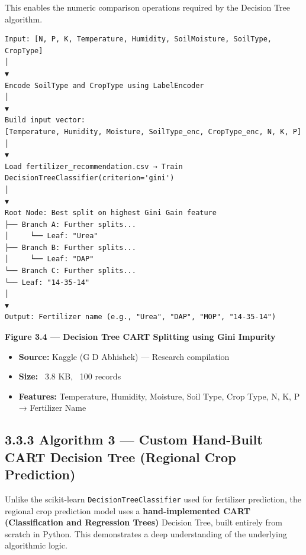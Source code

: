 \documentclass[12pt,a4paper]{report}
\begin{document}
This enables the numeric comparison operations required by the Decision Tree algorithm.


\begin{verbatim}
Input: [N, P, K, Temperature, Humidity, SoilMoisture, SoilType, CropType]
│
▼
Encode SoilType and CropType using LabelEncoder
│
▼
Build input vector:
[Temperature, Humidity, Moisture, SoilType_enc, CropType_enc, N, K, P]
│
▼
Load fertilizer_recommendation.csv → Train DecisionTreeClassifier(criterion='gini')
│
▼
Root Node: Best split on highest Gini Gain feature
├── Branch A: Further splits...
│     └── Leaf: "Urea"
├── Branch B: Further splits...
│     └── Leaf: "DAP"
└── Branch C: Further splits...
└── Leaf: "14-35-14"
│
▼
Output: Fertilizer name (e.g., "Urea", "DAP", "MOP", "14-35-14")
\end{verbatim}

\textbf{Figure 3.4 — Decision Tree CART Splitting using Gini Impurity}


\begin{itemize}
\item \textbf{Source:} Kaggle (G D Abhishek) — Research compilation
\item \textbf{Size:} ~3.8 KB, ~100 records
\item \textbf{Features:} Temperature, Humidity, Moisture, Soil Type, Crop Type, N, K, P → Fertilizer Name
\end{itemize}
\newpage

\subsection{3.3.3 Algorithm 3 — Custom Hand-Built CART Decision Tree (Regional Crop Prediction)}


Unlike the scikit-learn \texttt{DecisionTreeClassifier} used for fertilizer prediction, the regional crop prediction model uses a \textbf{hand-implemented CART (Classification and Regression Trees)} Decision Tree, built entirely from scratch in Python. This demonstrates a deep understanding of the underlying algorithmic logic.
\end{document}
